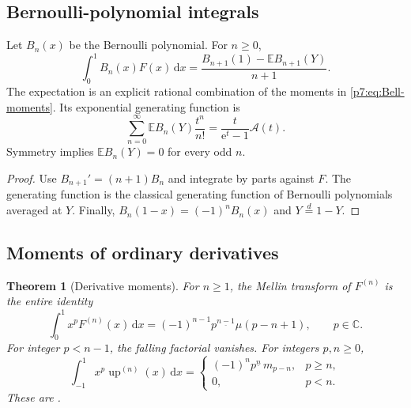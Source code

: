 \documentclass[11pt,oneside]{article}
\newtheorem{theorem}{Theorem}[section]
\theoremstyle{definition}
\theoremstyle{remark}
\newcommand{\Up}{\operatorname{up}}
\newcommand{\E}{\mathbb E}
\newcommand{\C}{\mathbb C}
\newcommand{\dd}{\,\mathrm d}
\newcommand{\e}{\mathrm e}
\newcommand{\fall}[2]{#1^{\underline{#2}}}
\newcommand{\1}{\mathbf 1}
\begin{document}
\subsection{Bernoulli-polynomial integrals}

\begin{proposition}
\label{p7:prop:Bernoulli-polynomial}
Let $B_n(x)$ be the Bernoulli polynomial.  For $n\ge0$,
\begin{equation}
 \int_0^1B_n(x)F(x)\dd x
 =\frac{B_{n+1}(1)-\E B_{n+1}(Y)}{n+1}.
 \label{p7:eq:Bernoulli-F-integral}
\end{equation}
The expectation is an explicit rational combination of the moments in
\cref{p7:eq:Bell-moments}.  Its exponential generating function is
\begin{equation}
 \sum_{n=0}^{\infty}\E B_n(Y)\frac{t^n}{n!}
 =\frac{t}{\e^t-1}\mathscr A(t).
 \label{p7:eq:Bernoulli-expectation-egf}
\end{equation}
Symmetry implies $\E B_n(Y)=0$ for every odd $n$.
\end{proposition}

\begin{proof}
Use $B_{n+1}'=(n+1)B_n$ and integrate by parts against $F$.  The generating function is the
classical generating function of Bernoulli polynomials averaged at $Y$.  Finally,
$B_n(1-x)=(-1)^nB_n(x)$ and $Y\overset d=1-Y$.
\end{proof}

\subsection{Moments of ordinary derivatives}

\begin{theorem}[Derivative moments]
\label{p7:thm:derivative-moments}
For $n\ge1$, the Mellin transform of $F^{(n)}$ is the entire identity
\begin{equation}
 \int_0^1x^pF^{(n)}(x)\dd x
 =(-1)^{n-1}\fall{p}{n-1}\mu(p-n+1),
 \qquad p\in\C.
 \label{p7:eq:F-derivative-moments}
\end{equation}
For integer $p<n-1$, the falling factorial vanishes.  For integers $p,n\ge0$,
\begin{equation}
 \int_{-1}^{1}x^p\Up^{(n)}(x)\dd x
 =\begin{cases}
 (-1)^n\fall p n\,m_{p-n},&p\ge n,\\
 0,&p<n.
 \end{cases}
 \label{p7:eq:up-derivative-moments}
\end{equation}
These are \statusproved.
\end{theorem}
\end{document}
